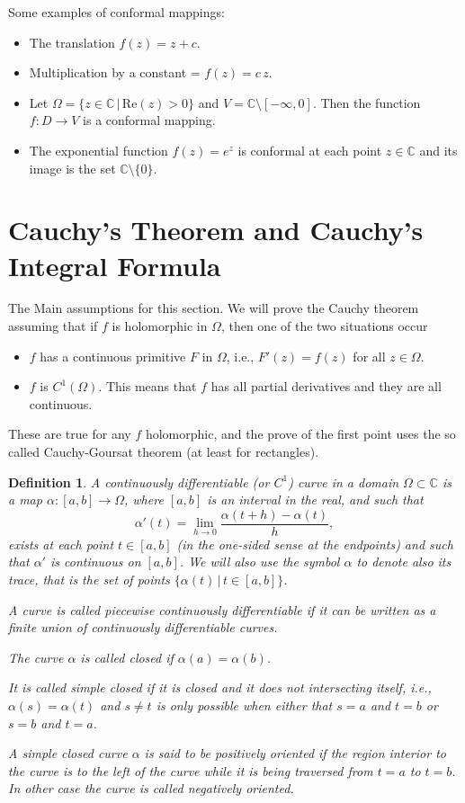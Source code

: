 \documentclass{amsart}
\newtheorem{mydef}{Definition}
\begin{document}
Some examples of conformal mappings:
\begin{itemize}
\item The translation \(f(z) = z + c\).
\item Multiplication by a constant = \(f(z) = c\,z\).
\item Let \(\Omega = \{ z \in \mathbb{C} \, | \, \mbox{Re}(z) > 0\}\) and \(V = \mathbb{C}\setminus [-\infty, 0]\). Then the function \(f: D \to V\) is a conformal mapping.
\item The exponential function \(f(z) = e^{z}\) is conformal at each point \(z\in\mathbb{C}\) and its image is the set \(\mathbb{C}\setminus\{0\}\).
\end{itemize}
\section{Cauchy's Theorem and Cauchy's Integral Formula}
\label{sec:org7bc77a4}

\alert{The Main assumptions for this section}. We will prove the Cauchy theorem assuming that if \(f\) is holomorphic in \(\Omega\), then one of the two situations occur
\begin{itemize}
\item \(f\) has a continuous primitive \(F\) in \(\Omega\), i.e., \(F'(z) = f(z)\) for all \(z\in \Omega\).
\item \(f\) is \(C^{1}(\Omega)\). This means that \(f\) has all partial derivatives and they are all continuous.
\end{itemize}

These are true for any \(f\) holomorphic, and the prove of the first point uses the so called \alert{Cauchy-Goursat} theorem (at least for rectangles). 


\begin{mydef}
A continuously differentiable (or \(C^1\)) curve in a domain \(\Omega \subset \mathbb{C}\) is a map \(\alpha : [a,b] \to \Omega\), where \([a,b]\) is an interval in the real, and 
such that 
\[ \alpha'(t) =  \lim_{h\to 0} \frac{ \alpha(t + h) - \alpha(t)}{h},\]
 exists at each point \(t\in [a, b]\) (in the one-sided
sense at the endpoints) and  such that \(\alpha'\) is continuous on \([a, b]\). 
We will also use the symbol \(\alpha\) to denote also its trace, that is the set
of points \(\{\alpha(t) \, | \,  t \in [a, b]\}\).

A curve is called \alert{piecewise continuously differentiable} if it can be written as a finite union of continuously differentiable curves. 

The curve \(\alpha\) is called \alert{closed} if \(\alpha (a) = \alpha (b)\).

It is called \alert{simple closed} if it is closed and it does not intersecting itself, i.e., \(\alpha(s) = \alpha (t)\) and \(s\neq t\) is only possible when either that \(s = a\) and \(t = b\) or \(s = b\) and \(t = a\).

A simple closed curve \(\alpha\) is said to be \alert{positively oriented} if the region interior to the curve is to the left of the curve while it is being traversed from \(t = a\) to \(t = b\). In other case the curve is called \alert{negatively oriented}.
\end{mydef}
\end{document}
